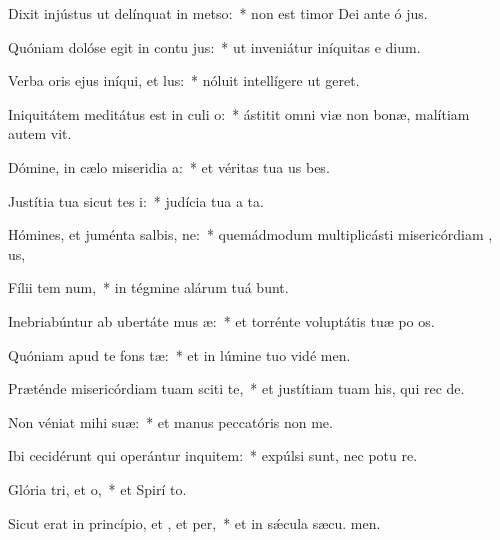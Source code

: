 \item Dixit injústus ut delínquat in metso:~* non est timor Dei ante ó jus.
\item Quóniam dolóse egit in contu jus:~* ut inveniátur iníquitas e  dium.
\item Verba oris ejus iníqui, et lus:~* nóluit intellígere ut  geret.
\item Iniquitátem meditátus est in culi o:~* ástitit omni viæ non bonæ, malítiam autem  vit.
\item Dómine, in cælo miseridia a:~* et véritas tua us  bes.
\item Justítia tua sicut tes i:~* judícia tua a ta.
\item Hómines, et juménta salbis, ne:~* quemádmodum multiplicásti misericórdiam , us,
\item Fílii tem num,~* in tégmine alárum tuá bunt.
\item Inebriabúntur ab ubertáte mus æ:~* et torrénte voluptátis tuæ po os.
\item Quóniam apud te  fons tæ:~* et in lúmine tuo vidé men.
\item Præténde misericórdiam tuam sciti te,~* et justítiam tuam his, qui rec  de.
\item Non véniat mihi  suæ:~* et manus peccatóris non  me.
\item Ibi cecidérunt qui operántur inquitem:~* expúlsi sunt, nec potu re.
\item Glória tri, et o,~* et Spirí to.
\item Sicut erat in princípio, et , et per,~* et in sǽcula sæcu. men.
